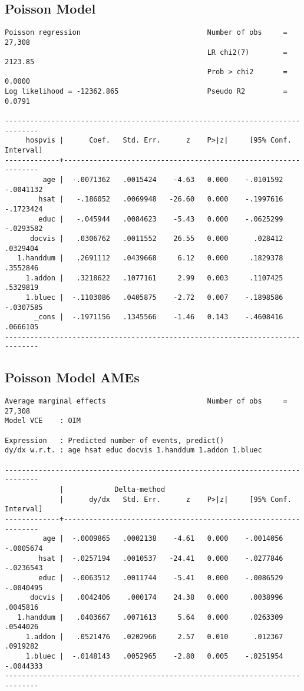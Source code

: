 \documentclass{article}
\begin{document}
\newpage
\hypertarget{poisson}{\subsection*{Poisson Model}}
\begin{verbatim}
Poisson regression                              Number of obs     =     27,308
                                                LR chi2(7)        =    2123.85
                                                Prob > chi2       =     0.0000
Log likelihood = -12362.865                     Pseudo R2         =     0.0791

------------------------------------------------------------------------------
     hospvis |      Coef.   Std. Err.      z    P>|z|     [95% Conf. Interval]
-------------+----------------------------------------------------------------
         age |  -.0071362   .0015424    -4.63   0.000    -.0101592   -.0041132
        hsat |   -.186052   .0069948   -26.60   0.000    -.1997616   -.1723424
        educ |   -.045944   .0084623    -5.43   0.000    -.0625299   -.0293582
      docvis |   .0306762   .0011552    26.55   0.000      .028412    .0329404
   1.handdum |   .2691112   .0439668     6.12   0.000     .1829378    .3552846
     1.addon |   .3218622   .1077161     2.99   0.003     .1107425    .5329819
     1.bluec |  -.1103086   .0405875    -2.72   0.007    -.1898586   -.0307585
       _cons |  -.1971156   .1345566    -1.46   0.143    -.4608416    .0666105
------------------------------------------------------------------------------
\end{verbatim}

\hypertarget{margins}{\subsection*{Poisson Model AMEs}}
\begin{verbatim}
Average marginal effects                        Number of obs     =     27,308
Model VCE    : OIM

Expression   : Predicted number of events, predict()
dy/dx w.r.t. : age hsat educ docvis 1.handdum 1.addon 1.bluec

------------------------------------------------------------------------------
             |            Delta-method
             |      dy/dx   Std. Err.      z    P>|z|     [95% Conf. Interval]
-------------+----------------------------------------------------------------
         age |  -.0009865   .0002138    -4.61   0.000    -.0014056   -.0005674
        hsat |  -.0257194   .0010537   -24.41   0.000    -.0277846   -.0236543
        educ |  -.0063512   .0011744    -5.41   0.000    -.0086529   -.0040495
      docvis |   .0042406    .000174    24.38   0.000     .0038996    .0045816
   1.handdum |   .0403667   .0071613     5.64   0.000     .0263309    .0544026
     1.addon |   .0521476   .0202966     2.57   0.010      .012367    .0919282
     1.bluec |  -.0148143   .0052965    -2.80   0.005    -.0251954   -.0044333
------------------------------------------------------------------------------
\end{verbatim}
\end{document}
